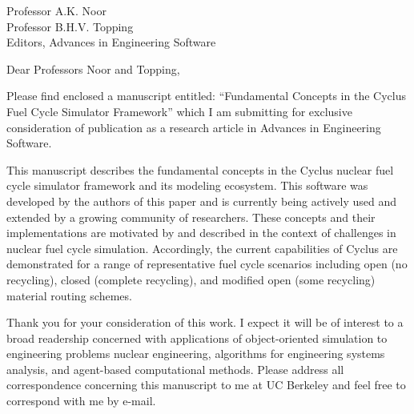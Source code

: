 \documentclass[11pt]{letter} %
\begin{document}


\begin{letter}{Professor A.K. Noor\\
Professor B.H.V. Topping\\
Editors, Advances in Engineering Software}

\address{Kathryn D. Huff\\
2150 Shattuck Ave.\\
Suite 230\\
Berkeley, CA 94720}



\opening{Dear Professors Noor and Topping,}

Please find enclosed a manuscript entitled: ``Fundamental Concepts in the 
Cyclus Fuel Cycle Simulator Framework'' which I am submitting for exclusive 
consideration of publication as a research article in Advances in Engineering 
Software.

This manuscript describes the fundamental concepts in the Cyclus nuclear fuel 
cycle simulator framework and its modeling ecosystem. This software was 
developed by the authors of this paper and is currently being actively used and 
extended by a growing community of researchers.  These concepts and their implementations 
are motivated by and described in the context of challenges in nuclear fuel 
cycle simulation.  Accordingly, the current capabilities of Cyclus are 
demonstrated for a range of representative fuel cycle scenarios including open 
(no recycling), closed (complete recycling), and modified open (some recycling) 
material routing schemes.

Thank you for your consideration of this work. I expect it will be of interest
to a broad readership concerned with applications of object-oriented simulation 
to engineering problems nuclear engineering, algorithms for engineering systems 
analysis, and agent-based computational methods. Please address all 
correspondence concerning this manuscript to me at UC Berkeley and feel free to 
correspond with me by e-mail.


\end{letter}
\end{document}

